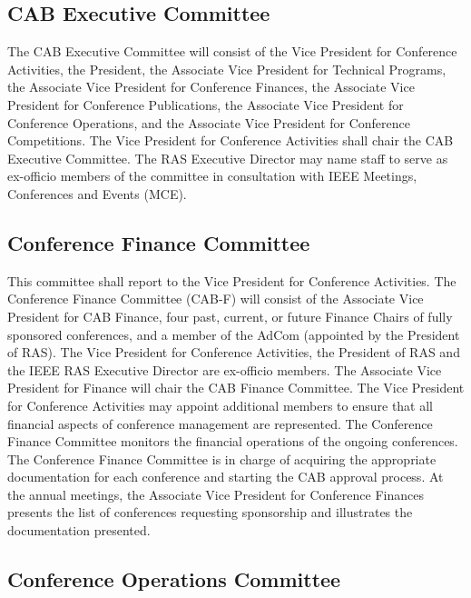 \documentclass[10pt]{article}
\begin{document}
\subsection{CAB Executive Committee}
\label{CAB:ExCom}

The CAB Executive Committee will consist of the Vice President for Conference Activities, the President, the Associate Vice President for Technical Programs, the Associate Vice President for Conference Finances, the Associate Vice President for Conference Publications, the Associate Vice President for Conference Operations, and the Associate Vice President for Conference Competitions. The Vice President for Conference Activities shall chair the CAB Executive Committee. The RAS Executive Director may name staff to serve as ex-officio members of the committee in consultation with IEEE Meetings, Conferences and Events (MCE).


\subsection{Conference Finance Committee}

This committee shall report to the Vice President for Conference Activities. The Conference Finance Committee (CAB-F) will consist of the Associate Vice President for CAB Finance, four past, current, or future Finance Chairs of fully sponsored conferences, and a member of the AdCom (appointed by the President of RAS).   The Vice President for Conference Activities, the President of RAS and the IEEE RAS Executive Director are ex-officio members. The Associate Vice President for Finance will chair the CAB Finance Committee. The Vice President for Conference Activities may appoint additional members to ensure that all financial aspects of conference management are represented. The Conference Finance Committee monitors the financial operations of the ongoing conferences. The Conference Finance Committee is in charge of acquiring the appropriate documentation for each conference and starting the CAB approval process. At the annual meetings, the Associate Vice President for Conference Finances presents the list of conferences requesting sponsorship and illustrates the documentation presented.

\subsection{Conference Operations Committee}
\end{document}
